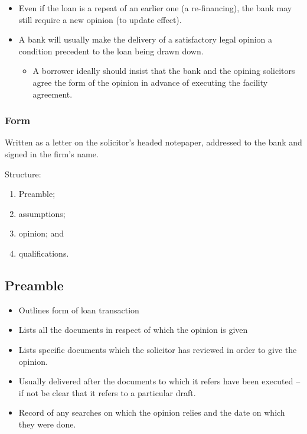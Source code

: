 \documentclass[
]{article}
\providecommand{\tightlist}{%
  \setlength{\itemsep}{0pt}\setlength{\parskip}{0pt}}
\begin{document}
\begin{itemize}
\tightlist
\item
  Even if the loan is a repeat of an earlier one (a re-financing), the
  bank may still require a new opinion (to update effect).
\item
  A bank will usually make the delivery of a satisfactory legal opinion
  a condition precedent to the loan being drawn down.

  \begin{itemize}
  \tightlist
  \item
    A borrower ideally should insist that the bank and the opining
    solicitors agree the form of the opinion in advance of executing the
    facility agreement.
  \end{itemize}
\end{itemize}

\hypertarget{form}{%
\subsubsection{Form}\label{form}}

Written as a letter on the solicitor's headed notepaper, addressed to
the bank and signed in the firm's name.

Structure:

\begin{enumerate}
\def\labelenumi{\arabic{enumi}.}
\tightlist
\item
  Preamble;
\item
  assumptions;
\item
  opinion; and
\item
  qualifications.
\end{enumerate}

\hypertarget{preamble}{%
\subsection{Preamble}\label{preamble}}

\begin{itemize}
\tightlist
\item
  Outlines form of loan transaction
\item
  Lists all the documents in respect of which the opinion is given
\item
  Lists specific documents which the solicitor has reviewed in order to
  give the opinion.
\item
  Usually delivered after the documents to which it refers have been
  executed -- if not be clear that it refers to a particular draft.
\item
  Record of any searches on which the opinion relies and the date on
  which they were done.
\end{itemize}
\end{document}
